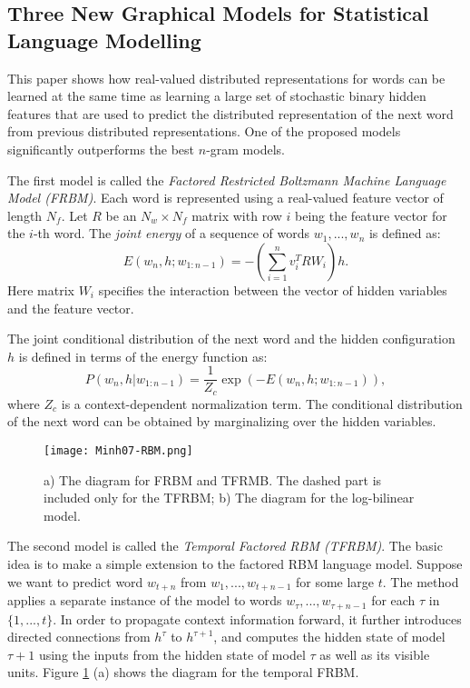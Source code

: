 \subsection{Three New Graphical Models for Statistical Language Modelling \cite{Mnih2007}}

This paper shows how real-valued distributed representations for words can be learned at the same time as learning a large set of stochastic binary hidden features that are used to predict the distributed representation of the next word from previous distributed representations. One of the proposed models significantly outperforms the best $n$-gram models.

The first model is called the \emph{Factored Restricted Boltzmann Machine Language Model (FRBM)}. Each word is represented using a real-valued feature vector of length $N_f$. Let $R$ be an $N_w \times N_f$ matrix with row $i$ being the feature vector for the $i$-th word. The \emph{joint energy} of a sequence of words $w_1, ..., w_n$ is defined as:
$$E(w_n, h; w_{1:n-1}) = -(\sum_{i=1}^n v_i^T R W_i)h.$$
Here matrix $W_i$ specifies the interaction between the vector of hidden variables and the feature vector.

The joint conditional distribution of the next word and the hidden configuration $h$ is defined in terms of the energy function as:
$$P(w_n, h | w_{1:n-1}) = \frac{1}{Z_c} \exp(-E(w_n,h; w_{1:n-1})),$$
where $Z_c$ is a context-dependent normalization term. The conditional distribution of the next word can be obtained by marginalizing over the hidden variables.
\begin{figure}
  \centering
  \texttt{[image: Minh07-RBM.png]}\\
  \caption{a) The diagram for FRBM and TFRMB. The dashed part is included only for the TFRBM; b) The diagram for the log-bilinear model.}\label{fig:Minh07-RBM}
\end{figure}

The second model is called the \emph{Temporal Factored RBM (TFRBM)}. The basic idea is to make a simple extension to the factored RBM language model. Suppose we want to predict word $w_{t+n}$ from $w_1, ..., w_{t+n-1}$ for some large $t$. The method applies a separate instance of the model to words $w_\tau, ..., w_{\tau+n-1}$ for each $\tau$ in $\{1, ..., t\}$. In order to propagate context information forward, it further introduces directed connections from $h^\tau$ to $h^{\tau+1}$, and computes the hidden state of model $\tau+1$ using the inputs from the hidden state of model $\tau$ as well as its visible units. Figure \ref{fig:Minh07-RBM} (a) shows the diagram for the temporal FRBM.

